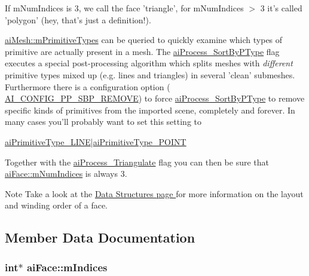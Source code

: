 If m\-Num\-Indices is 3, we call the face 'triangle', for m\-Num\-Indices $>$ 3 it's called 'polygon' (hey, that's just a definition!). \par
 \hyperlink{structai_mesh_a99d66ac0a444068c1b252b30265cbf53}{ai\-Mesh\-::m\-Primitive\-Types} can be queried to quickly examine which types of primitive are actually present in a mesh. The \hyperlink{ai_post_process_8h_a64795260b95f5a4b3f3dc1be4f52e410ab4484f73635d633cd79973bac1431ed6}{ai\-Process\-\_\-\-Sort\-By\-P\-Type} flag executes a special post-\/processing algorithm which splits meshes with {\itshape different} primitive types mixed up (e.\-g. lines and triangles) in several 'clean' submeshes. Furthermore there is a configuration option ( \hyperlink{ai_config_8h_a971e337cb0d526861142586b8341cb98}{A\-I\-\_\-\-C\-O\-N\-F\-I\-G\-\_\-\-P\-P\-\_\-\-S\-B\-P\-\_\-\-R\-E\-M\-O\-V\-E}) to force \hyperlink{ai_post_process_8h_a64795260b95f5a4b3f3dc1be4f52e410ab4484f73635d633cd79973bac1431ed6}{ai\-Process\-\_\-\-Sort\-By\-P\-Type} to remove specific kinds of primitives from the imported scene, completely and forever. In many cases you'll probably want to set this setting to 
\begin{DoxyCode}
\hyperlink{ai_mesh_8h_ac352902280db7c3bd8ba64c133b7f03fa724184f90f0e408b903d07aed39914b4}{aiPrimitiveType\_LINE}|\hyperlink{ai_mesh_8h_ac352902280db7c3bd8ba64c133b7f03fafb9158b4924ec9457647c759aa961053}{aiPrimitiveType\_POINT}
\end{DoxyCode}
 Together with the \hyperlink{ai_post_process_8h_a64795260b95f5a4b3f3dc1be4f52e410a9c3de834f0307f31fa2b1b6d05dd592b}{ai\-Process\-\_\-\-Triangulate} flag you can then be sure that \hyperlink{structai_face_adda2698cec0ebfe651572f4a5701360b}{ai\-Face\-::m\-Num\-Indices} is always 3. \begin{DoxyNote}{Note}
Take a look at the \hyperlink{wglew_8h_a465dec1ce63d00e7ee74e136a178c031}{Data Structures page } for more information on the layout and winding order of a face. 
\end{DoxyNote}


\subsection{Member Data Documentation}
\hypertarget{structai_face_a2026b434c40cf1636f9f464a592ec36c}{
\subsubsection[{m\-Indices}]{ {\bf int}$\ast$ ai\-Face\-::m\-Indices}}\label{structai_face_a2026b434c40cf1636f9f464a592ec36c}


